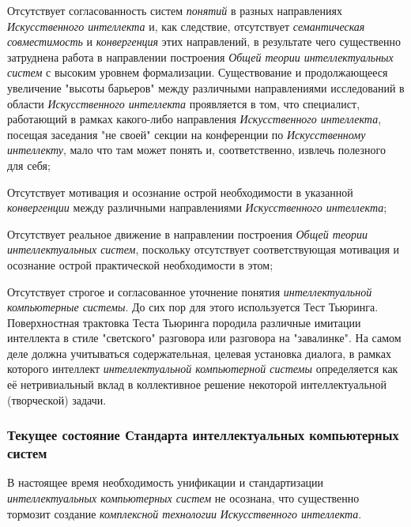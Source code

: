 \begin{textitemize}
	\item
	Отсутствует согласованность систем \textit{понятий} в разных направлениях \textit{Искусственного интеллекта} и, как следствие, отсутствует \textit{семантическая совместимость} и \textit{конвергенция} этих направлений, в результате чего существенно затруднена работа в направлении построения \textit{Общей теории интеллектуальных систем} с высоким уровнем формализации. Существование и продолжающееся увеличение "высоты барьеров" между различными направлениями исследований в области \textit{Искусственного интеллекта} проявляется в том, что специалист, работающий в рамках какого-либо направления \textit{Искусственного интеллекта}, посещая заседания "не своей" секции на конференции по \textit{Искусственному интеллекту}, мало что там может понять и, соответственно, извлечь полезного для себя;
	\item
	Отсутствует мотивация и осознание острой необходимости в указанной \textit{конвергенции} между различными направлениями \textit{Искусственного интеллекта};
	\item
	Отсутствует реальное движение в направлении построения \textit{Общей теории интеллектуальных систем}, поскольку отсутствует соответствующая мотивация и осознание острой практической необходимости в этом;
	\item
	Отсутствует строгое и согласованное уточнение понятия \textit{интеллектуальной компьютерные системы}. До сих пор для этого используется Тест Тьюринга. Поверхностная трактовка Теста Тьюринга породила различные имитации интеллекта в стиле "светского"{} разговора или разговора на "завалинке"{}. На самом деле должна учитываться содержательная, целевая установка диалога, в рамках которого интеллект \textit{интеллектуальной компьютерной системы} определяется как её нетривиальный вклад в коллективное решение некоторой интеллектуальной (творческой) задачи.
\end{textitemize}

\subsubsection{Текущее состояние Стандарта интеллектуальных компьютерных систем}

В настоящее время необходимость унификации и стандартизации \textit{интеллектуальных компьютерных систем} не осознана, что существенно тормозит создание \textit{комплексной технологии} \textit{Искусственного интеллекта}.


